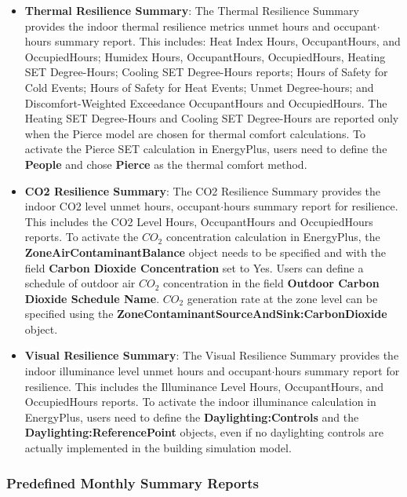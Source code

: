 \begin{itemize}
\item \textbf{Thermal Resilience Summary}: The Thermal Resilience Summary provides the indoor thermal resilience metrics
unmet hours and occupant$·$hours summary report. This includes: Heat Index
Hours, OccupantHours, and OccupiedHours; Humidex Hours, OccupantHours,
OccupiedHours, Heating SET Degree-Hours; Cooling SET Degree-Hours reports; Hours
of Safety for Cold Events; Hours of Safety for Heat Events; Unmet Degree-hours;
and Discomfort-Weighted Exceedance OccupantHours and OccupiedHours. The Heating
SET Degree-Hours and Cooling SET Degree-Hours are reported only when the Pierce
model are chosen for thermal comfort calculations. To activate the Pierce SET
calculation in EnergyPlus, users need to define the \textbf{People} and chose
\textbf{Pierce} as the thermal comfort method.
\item \textbf{CO2 Resilience Summary}: The CO2 Resilience Summary provides the indoor CO2 level unmet hours,
occupant$·$hours summary report for resilience. This includes the CO2 Level
Hours, OccupantHours and OccupiedHours reports. To activate the $CO_2$
concentration calculation in EnergyPlus, the \textbf{ZoneAirContaminantBalance}
object needs to be specified and with the field \textbf{Carbon Dioxide
  Concentration} set to Yes. Users can define a schedule of outdoor air $CO_2$
concentration in the field \textbf{Outdoor Carbon Dioxide Schedule Name}. $CO_2$
generation rate at the zone level can be specified using the
\textbf{ZoneContaminantSourceAndSink:CarbonDioxide} object.
\item \textbf{Visual Resilience Summary}: The Visual Resilience Summary provides the indoor illuminance level unmet hours
and occupant$·$hours summary report for resilience. This includes the
Illuminance Level Hours, OccupantHours, and OccupiedHours reports. To activate
the indoor illuminance calculation in EnergyPlus, users need to define the
\textbf{Daylighting:Controls} and the \textbf{Daylighting:ReferencePoint}
objects, even if no daylighting controls are actually implemented in the
building simulation model.
\end{itemize}

\subsubsection{Predefined Monthly Summary Reports}\label{predefined-monthly-summary-reports}

